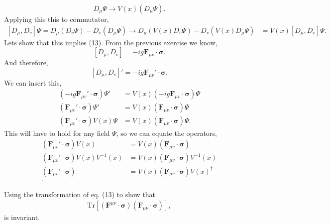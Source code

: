 \documentclass[working, oneside]{../../../Preambles/tuftebook}
\begin{document}
\[
D_\mu\Psi \to V\left( x \right) \left( D_\mu \Psi \right) 
.\] 
Applying this this to commutator,
\begin{align*}
    \left[ D_\mu , D_v \right] \Psi = D_\mu \left( D_v \Psi \right) - D_v\left( D_\mu \Psi \right)\to   D_\mu \left(V\left( x \right)  D_v \Psi \right) - D_v\left( V\left( x \right) D_\mu \Psi \right)
    &=  V\left( x \right) \left[ D_\mu , D_v \right] \Psi
.\end{align*} 
Lets show that this implies (13). From the previous exercise we know,
\[
\left[ D_\mu , D_v \right] = -ig \mathbf{F}_{\mu v}\cdot \mathbf{\sigma}
.\] 
And therefore,
\[
\left[ D_\mu , D_v \right]' = -ig \mathbf{F}_{\mu v}'\cdot \mathbf{\sigma}
.\] 
We can insert this,
\begin{align*}
    \left( -ig\mathbf{F}_{\mu  v}' \cdot  \mathbf{\sigma} \right) \Psi' &= V\left( x \right) \left( -ig \mathbf{F}_{\mu  v}\cdot \mathbf{\sigma} \right) \Psi\\
    \left( \mathbf{F}_{\mu  v}' \cdot  \mathbf{\sigma} \right) \Psi' &= V\left( x \right) \left( \mathbf{F}_{\mu  v}\cdot \mathbf{\sigma} \right) \Psi \\
    \left( \mathbf{F}_{\mu  v}' \cdot  \mathbf{\sigma} \right) V\left( x \right) \Psi &= V\left( x \right) \left( \mathbf{F}_{\mu  v}\cdot \mathbf{\sigma} \right) \Psi
.\end{align*}
This will have to hold for any field $\Psi$, so we can equate the operators,
\begin{align*}
    \left( \mathbf{F}_{\mu  v}' \cdot  \mathbf{\sigma} \right) V\left( x \right)  &= V\left( x \right) \left( \mathbf{F}_{\mu  v}\cdot \mathbf{\sigma} \right) \\
    \left( \mathbf{F}_{\mu  v}' \cdot  \mathbf{\sigma} \right) V\left( x \right) V^{-1}\left( x \right)  &= V\left( x \right) \left( \mathbf{F}_{\mu  v}\cdot \mathbf{\sigma} \right) V^{-1}\left( x \right) \\
    \left( \mathbf{F}_{\mu  v}' \cdot  \mathbf{\sigma} \right) &= V\left( x \right) \left( \mathbf{F}_{\mu  v}\cdot \mathbf{\sigma} \right) V\left( x \right)^{\dagger} \\
.\end{align*}
\begin{exercise}[3]
Using the transformation of eq. (13) to show that
\begin{align*}
\text{Tr} \left[ (\mathbf{F}^{\mu\nu} \cdot \boldsymbol{\sigma}) (\mathbf{F}_{\mu\nu} \cdot \boldsymbol{\sigma}) \right], \tag{14}
\end{align*}
is invariant.
\end{exercise}
\end{document}
